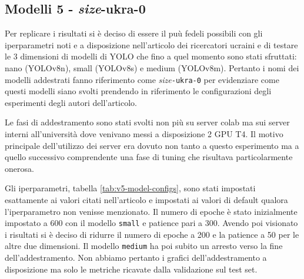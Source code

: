 \subsection*{Modelli 5 - \textit{size}-ukra-0}


Per replicare i risultati si è deciso di essere il puù fedeli possibili con gli iperparametri 
noti e a disposizione nell'articolo dei ricercatori ucraini e di testare le 3 dimensioni di modelli
di YOLO che fino a quel momento sono stati sfruttati: nano (YOLOv8n), small (YOLOv8s) e medium (YOLOv8m).
Pertanto i nomi dei modelli addestrati fanno riferimento come \textit{size}\texttt{-ukra-0} per 
evidenziare come questi modelli siano svolti prendendo in riferimento le configurazioni degli 
esperimenti degli autori dell'articolo.

Le fasi di addestramento sono stati svolti non più su server colab ma sui server interni 
all'università dove venivano messi a disposizione 2 GPU T4. Il motivo principale dell'utilizzo dei 
server era dovuto non tanto a questo esperimento ma a quello successivo comprendente una fase di 
tuning che risultava particolarmente onerosa.

Gli iperparametri, tabella \ref{tab:v5-model-configs}, sono stati impostati esattamente ai valori citati nell'articolo e impostati
ai valori di default qualora l'iperparametro non venisse menzionato. Il numero di epoche è stato inizialmente
impostato a 600 con il modello \texttt{small} e patience pari a 300. Avendo poi visionato i 
risultati si è deciso di ridurre il numero di epoche a 200 e la patience a 50 per le altre due 
dimensioni. Il modello \texttt{medium} ha poi subito un arresto verso la fine dell'addestramento. Non 
abbiamo pertanto i grafici dell'addestramento a disposizione ma solo le metriche ricavate dalla validazione
sul test set. 


